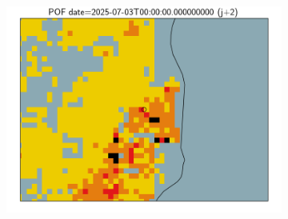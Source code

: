 \documentclass{article}
\begin{document}
\begin{figure}[H]
\begin{subfigure}[b]{0.31\textwidth}
    \end{subfigure}
    \begin{subfigure}[b]{0.36\textwidth}
        \centering
        \includegraphics[width=0.85\linewidth]{pof_184_j2.png} %
    \end{subfigure}
\end{figure}


\vspace{-1em}
\end{document}
